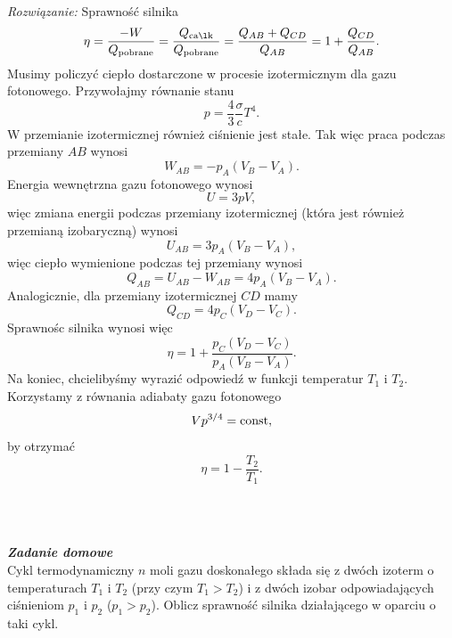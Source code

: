 \documentclass[11pt,a4paper]{article}
\newcounter{zaddom}\newcommand{\zaddom}[1][]{\addtocounter{zaddom}{1} ~\\  {\bf \emph{Zadanie domowe \arabic{zaddom} #1 }} \\}
\begin{document}
{\em Rozwiązanie:}
Sprawność silnika
\begin{equation}
	\eta = \frac{- W}{Q_{\rm pobrane}} = \frac{Q_{\rm całk}}{Q_{\rm pobrane}} = \frac{Q_{AB} + Q_{CD}}{Q_{AB}} = 1 + \frac{Q_{CD}}{Q_{AB}}.
\end{equation}
Musimy policzyć ciepło dostarczone w procesie izotermicznym dla gazu fotonowego. Przywołajmy równanie stanu
\begin{equation}
	p = \frac{4}{3} \frac{\sigma}{c} T^4.
\end{equation}
W przemianie izotermicznej również ciśnienie jest stałe. Tak więc praca podczas przemiany $AB$ wynosi
\begin{equation}
	W_{AB} = - p_A (V_B - V_A).
\end{equation}
Energia wewnętrzna gazu fotonowego wynosi
\begin{equation}
	U = 3 p V, 
\end{equation}
więc zmiana energii podczas przemiany izotermicznej (która jest również przemianą izobaryczną) wynosi
\begin{equation}
	U_{AB} = 3 p_A (V_B - V_A),
\end{equation}
więc ciepło wymienione podczas tej przemiany wynosi
\begin{equation}
	Q_{AB} = U_{AB} - W_{AB} = 4 p_A (V_B - V_A).
\end{equation}
Analogicznie, dla przemiany izotermicznej $CD$ mamy
\begin{equation}
	Q_{CD} = 4 p_C (V_D - V_C).
\end{equation}
Sprawnośc silnika wynosi więc
\begin{equation}
	\eta = 1 + \frac{p_C (V_D - V_C)}{p_A (V_B - V_A)}.
\end{equation}
Na koniec, chcielibyśmy wyrazić odpowiedź w funkcji temperatur $T_1$ i $T_2$. Korzystamy z równania adiabaty gazu fotonowego
\begin{equation}
	V p^{3/4} = {\rm const},
\end{equation} 
by otrzymać
\begin{equation}
	\eta = 1 - \frac{T_2}{T_1}.
\end{equation}

\pagebreak
~
\zaddom
Cykl termodynamiczny $n$ moli gazu doskonałego składa się z dwóch izoterm o temperaturach $T_1$ i $T_2$
 (przy czym $T_1 > T_2$) i z dwóch izobar odpowiadających ciśnieniom $p_1$ i $p_2$ ($p_1 > p_2$).
 Oblicz sprawność silnika działającego w oparciu o taki cykl.
\end{document}
